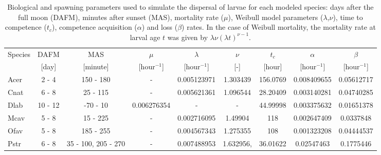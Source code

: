 \documentclass[preprint,12pt,authoryear]{elsarticle}
\begin{document}
\begin{table}
    \begin{adjustwidth}{-1in}{-1in}
    \centering
    \scriptsize
    \begin{tabular}{lcccccccc}
        \hline
        Species & DAFM  & MAS      & $\mu$         & $\lambda$     & $\nu$ & $t_c$  & $\alpha$      & $\beta$ \\
                & [day] & [minute] & [hour$^{-1}$] & [hour$^{-1}$] & [-]   & [hour] & [hour$^{-1}$] & [hour$^{-1}$] \\
        \hline
        Acer & 2 - 4 & 150 - 180 & - & 0.005123971 & 1.303439 & 156.0769 & 0.008409655 & 0.05612717 \\
        Cnat & 6 - 8 & 25 - 115 & - & 0.005621361 & 1.096544 & 28.20409 & 0.003140281 & 0.04740285 \\
        Dlab & 10 - 12 & -70 - 10 & 0.006276354 & - & - & 44.99998 & 0.003375632 & 0.01651378 \\
        Mcav  & 5 - 8 & 15 - 225 & - & 0.002716095 & 1.49904 & 118 & 0.002647409 & 0.0337848 \\
        Ofav & 5 - 8 & 185 - 255 & - & 0.004567343 & 1.275355 & 108 & 0.001323208 & 0.04444537 \\
        Pstr & 6 - 8 &  35 - 100, 205 - 270 & - & 0.007488953 & 1.632956, & 36.01622 & 0.02547463 & 0.1775446 \\
        \hline
    \end{tabular}
    \end{adjustwidth}
    \caption{Biological and spawning parameters used to simulate the dispersal of larvae for each modeled species: days after the full moon (DAFM), minutes after sunset (MAS), mortality rate ($\mu$), Weibull model parameters ($\lambda$,$\nu$), time to competence ($t_c$), competence acquisition ($\alpha$) and loss ($\beta$) rates. In the case of Weibull mortality, the mortality rate at larval age $t$ was given by $\lambda\nu(\lambda t)^{\nu-1}$.}\label{tab:species}
\end{table}
\end{document}
